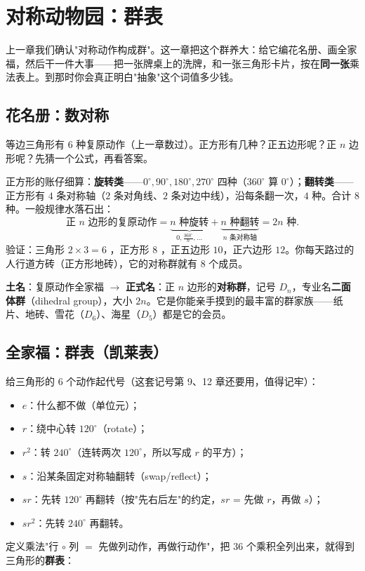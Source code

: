 \chapter{对称动物园：群表}

上一章我们确认"对称动作构成群"。这一章把这个群养大：给它编花名册、画全家福，然后干一件大事——把一张牌桌上的洗牌，和一张三角形卡片，按在\textbf{同一张}乘法表上。到那时你会真正明白"抽象"这个词值多少钱。

\section{花名册：数对称}

\begin{kaiwei}
等边三角形有 $6$ 种复原动作（上一章数过）。正方形有几种？正五边形呢？正 $n$ 边形呢？先猜一个公式，再看答案。
\end{kaiwei}

正方形的账仔细算：\textbf{旋转类}——$0^\circ, 90^\circ, 180^\circ, 270^\circ$ 四种（$360^\circ$ 算 $0^\circ$）；\textbf{翻转类}——正方形有 $4$ 条对称轴（$2$ 条对角线、$2$ 条对边中线），沿每条翻一次，$4$ 种。合计 $8$ 种。一般规律水落石出：
\[
\text{正 } n \text{ 边形的复原动作} = \underbrace{n \text{ 种旋转}}_{0, \tfrac{360^\circ}{n}, \dots} + \underbrace{n \text{ 种翻转}}_{n \text{ 条对称轴}} = 2n \text{ 种} .
\]
验证：三角形 $2\times3 = 6$ \checkmark，正方形 $8$ \checkmark，正五边形 $10$，正六边形 $12$。你每天路过的人行道方砖（正方形地砖），它的对称群就有 $8$ 个成员。

\begin{faming}
\textbf{土名}：复原动作全家福 $\to$ \textbf{正式名}：正 $n$ 边形的\textbf{对称群}，记号 $D_n$，专业名\textbf{二面体群}（dihedral group），大小 $2n$。它是你能亲手摸到的最丰富的群家族——纸片、地砖、雪花（$D_6$）、海星（$D_5$）都是它的会员。
\end{faming}

\section{全家福：群表（凯莱表）}

给三角形的 $6$ 个动作起代号（这套记号第 9、12 章还要用，值得记牢）：
\begin{itemize}
\item $e$：什么都不做（单位元）；
\item $r$：绕中心转 $120^\circ$（rotate）；
\item $r^2$：转 $240^\circ$（连转两次 $120^\circ$，所以写成 $r$ 的平方）；
\item $s$：沿某条固定对称轴翻转（swap/reflect）；
\item $sr$：先转 $120^\circ$ 再翻转（按"先右后左"的约定，$sr$ = 先做 $r$，再做 $s$）；
\item $sr^2$：先转 $240^\circ$ 再翻转。
\end{itemize}
定义乘法"行 $\circ$ 列 $=$ 先做列动作，再做行动作"，把 $36$ 个乘积全列出来，就得到三角形的\textbf{群表}：

